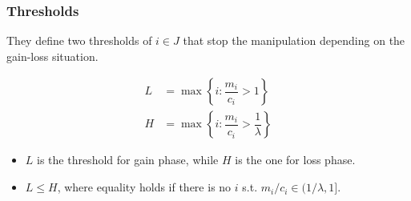 \documentclass[dvipdfmx,12pt]{beamer}
\begin{document}
\begin{frame}\frametitle{Thresholds}
  They define two thresholds of $i \in J$ that stop the manipulation depending
  on the gain-loss situation.

  \begin{align*}
    L &= \max \left \{ i: \dfrac{m_i}{c_i} > 1 \right \} \\
    H &= \max \left \{ i: \dfrac{m_i}{c_i} > \dfrac{1}{\lambda} \right \}
  \end{align*}

  \begin{itemize}
    \item $L$ is the threshold for gain phase, while $H$ is the
     one for loss phase.

     \item $L \leq H$, where equality holds if there is no $i$ s.t.
     $m_i/c_i \in (1/\lambda , 1]$.
  \end{itemize}
\end{frame}
\end{document}
